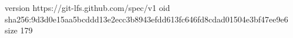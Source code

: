 version https://git-lfs.github.com/spec/v1
oid sha256:9d3d0e15aa5bcddd13e2ecc3b8943efdd613fc646fd8cdad01504e3bf47ee9e6
size 179
